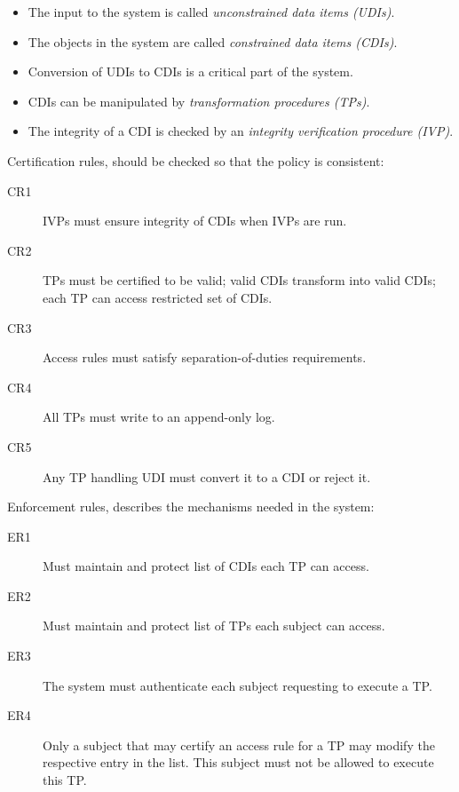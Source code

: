 \begin{frame}
  \begin{itemize}
    \item The input to the system is called \emph{unconstrained data items 
      (UDIs)}.

    \item The objects in the system are called \emph{constrained data items 
      (CDIs)}.

    \item Conversion of UDIs to CDIs is a critical part of the system.

    \item CDIs can be manipulated by \emph{transformation procedures (TPs)}.

    \item The integrity of a CDI is checked by an \emph{integrity verification 
      procedure (IVP)}.

  \end{itemize}
\end{frame}

\begin{frame}
  Certification rules, should be checked so that the policy is consistent:
  \begin{description}
    \item[CR1] IVPs must ensure integrity of CDIs when IVPs are run.
    \item[CR2] TPs must be certified to be valid; valid CDIs transform into 
      valid CDIs; each TP can access restricted set of CDIs.
    \item[CR3] Access rules must satisfy separation-of-duties requirements.
    \item[CR4] All TPs must write to an append-only log.
    \item[CR5] Any TP handling UDI must convert it to a CDI or reject it.
  \end{description}
\end{frame}

\begin{frame}
  Enforcement rules, describes the mechanisms needed in the system:
  \begin{description}
    \item[ER1] Must maintain and protect list of CDIs each TP can access.
    \item[ER2] Must maintain and protect list of TPs each subject can access.
    \item[ER3] The system must authenticate each subject requesting to execute 
      a TP\@.
    \item[ER4] Only a subject that may certify an access rule for a TP may 
      modify the respective entry in the list.
      This subject must not be allowed to execute this TP\@.
  \end{description}
\end{frame}


